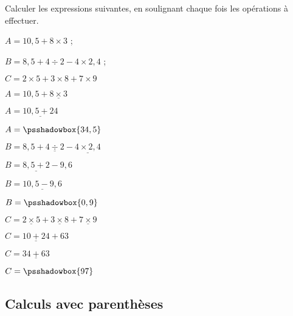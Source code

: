 \begin{exemple}
   Calculer les expressions suivantes, en soulignant chaque fois les opérations à effectuer.
   
   $A=10,5+8\times 3$ ;
   
   $B=8,5+4\div 2-4\times 2,4$ ;
   
   $C=2\times 5+3\times 8+7\times 9$
   \correction

   \smallskip
   \begin{minipage}{0.5\linewidth}
      \begin{list}{}{}
               \item $A=10,5+\underline{8\times 3}$
               \item $A=\underline{10,5+24}$
               \item $A=\psshadowbox{34,5}$               
      \end{list}
   \end{minipage}      
   \begin{minipage}{0.5\linewidth}
      \begin{list}{}{}
         \item $B=8,5+\underline{4\div 2}-\underline{4\times 2,4}$
         \item $B=\underline{8,5+2}-9,6$
         \item $B=\underline{10,5-9,6}$
         \item $B=\psshadowbox{0,9}$         
      \end{list}
   \end{minipage}
   \begin{minipage}{0.5\linewidth}
      \begin{list}{}{}
         \item $C=\underline{2\times 5}+\underline{3\times 8}+\underline{7\times 9}$
         \item $C=\underline{10+24}+63$
         \item $C=\underline{34+63}$
         \item $C=\psshadowbox{97}$         
      \end{list}
   \end{minipage}   
\end{exemple}

\subsection{Calculs avec parenthèses}

